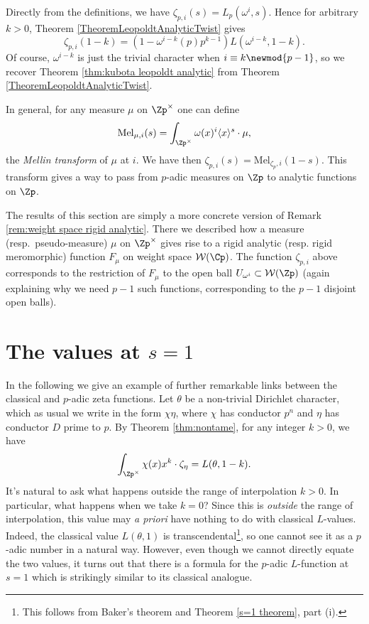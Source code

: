 \documentclass[a4paper,10pt, english, reqno]{smfart}
\newcommand{\cW}{\mathcal{W}}
\numberwithin{equation}{section}
\begin{document}
\begin{remark} Directly from the definitions, we have $\zeta_{p,i}(s) = L_p(\omega^{i},s)$. Hence for arbitrary $k > 0$, Theorem \ref{TheoremLeopoldtAnalyticTwist} gives
\[\zeta_{p,i}(1-k) = (1-\omega^{i-k}(p)p^{k-1})L(\omega^{i-k},1-k).\]
Of course, $\omega^{i-k}$ is just the trivial character when $i \equiv k \newmod{p-1}$, so we recover Theorem \ref{thm:kubota leopoldt analytic} from Theorem \ref{TheoremLeopoldtAnalyticTwist}.
\end{remark}

In general, for any measure $\mu$ on $\Zp^\times$ one can define
\[\mathrm{Mel}_{\mu,i}(s) = \int_{\Zp^\times} \omega(x)^i \langle x\rangle^s \cdot\mu,\]
the \emph{Mellin transform} of $\mu$ at $i$. We have then $\zeta_{p,i}(s) = \mathrm{Mel}_{\zeta_p,i}(1-s)$. This transform gives a way to pass from $p$-adic measures on $\Zp$ to analytic functions on $\Zp$.


\begin{remark}
	The results of this section are simply a more concrete version of Remark
\ref{rem:weight space rigid analytic}. There we described how a measure (resp.\ pseudo-measure) $\mu$ on $\Zp^\times$ gives rise to a rigid analytic (resp. rigid meromorphic) function $F_\mu$ on weight space $\cW(\Cp)$. The function $\zeta_{p,i}$ above corresponds to the restriction of $F_\mu$ to the open ball $U_{\omega^i} \subset \cW(\Zp)$ (again explaining why we need $p-1$ such functions, corresponding to the $p-1$ disjoint open balls).
 \end{remark}






\section{The values at $s=1$}\label{sec:s=1}

In the following we give an example of further remarkable links between the classical and $p$-adic zeta functions. Let $\theta$ be a non-trivial Dirichlet character, which as usual we write in the form $\chi\eta$, where $\chi$ has conductor $p^n$ and $\eta$ has conductor $D$ prime to $p$. By Theorem \ref{thm:nontame}, for any integer $k > 0$, we have
\[ \int_{\Zp^\times}\chi(x)x^k \cdot \zeta_{\eta} = L(\theta,1-k).\]
 It's natural to ask what happens outside the range of interpolation $k >0$. In particular, what happens when we take $k = 0$? Since this is \emph{outside} the range of interpolation, this value may \emph{a priori} have nothing to do with classical $L$-values. Indeed, the classical value $L(\theta,1)$ is transcendental\footnote{This follows from Baker's theorem and Theorem \ref{s=1 theorem}, part (i).}, so one cannot see it as a $p$-adic number in a natural way. However, even though we cannot directly equate the two values, it turns out that there is a formula for the $p$-adic $L$-function at $s=1$ which is strikingly similar to its classical analogue.
\end{document}
